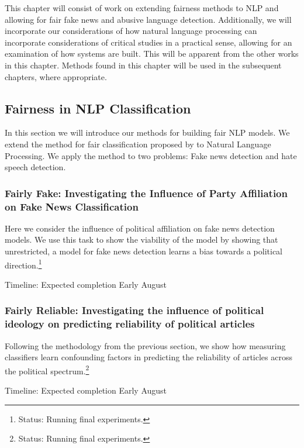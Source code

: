 {This chapter will consist of work on extending fairness methods to NLP and allowing for fair fake news and abusive language detection. Additionally, we will incorporate our considerations of how natural language processing can incorporate considerations of critical studies in a practical sense, allowing for an examination of how systems are built. This will be apparent from the other works in this chapter. Methods found in this chapter will be used in the subsequent chapters, where appropriate.

\subsection{Fairness in NLP Classification}

In this section we will introduce our methods for building fair NLP models. We extend the method for fair classification proposed by \citep{Agarwal:2018} to Natural Language Processing. We apply the method to two problems: Fake news detection and hate speech detection.

\subsubsection{Fairly Fake: Investigating the Influence of Party Affiliation on Fake News Classification}
Here we consider the influence of political affiliation on fake news detection models. We use this task to show the viability of the model by showing that unrestricted, a model for fake news detection learns a bias towards a political direction.\footnote{Status: Running final experiments.}

Timeline: Expected completion Early August
\subsubsection{Fairly Reliable: Investigating the influence of political ideology on predicting reliability of political articles}
Following the methodology from the previous section, we show how measuring classifiers learn confounding factors in predicting the reliability of articles across the political spectrum.\footnote{Status: Running final experiments.}

Timeline: Expected completion Early August


}
